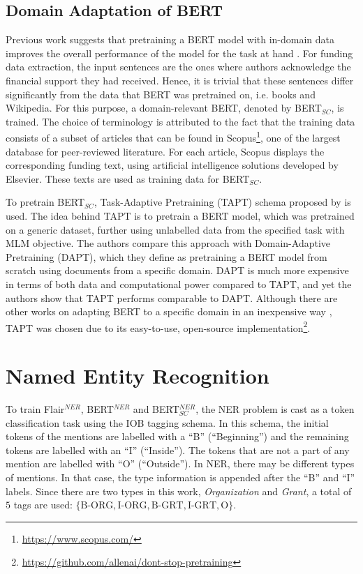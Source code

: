 \documentclass{report}
\theoremstyle{definition}
\theoremstyle{remark}
\begin{document}
\subsection{Domain Adaptation of BERT}
Previous work suggests that pretraining a BERT model with in-domain data improves the overall performance of the model for the task at hand \cite{DontStop,exBERT,quote3}. For funding data extraction, the input sentences are the ones where authors acknowledge the financial support they had received. Hence, it is trivial that these sentences differ significantly from the data that BERT was pretrained on, i.e. books and Wikipedia.  For this purpose, a domain-relevant BERT, denoted by BERT$_{SC}$, is trained. The choice of terminology is attributed to the fact that the training data consists of a subset of articles that can be found in Scopus\footnote{\url{https://www.scopus.com/}}, one of the largest database for peer-reviewed literature. For each article, Scopus displays the corresponding funding text, using artificial intelligence solutions developed by Elsevier. These texts are used as training data for BERT$_{SC}$.

To pretrain BERT$_{SC}$, Task-Adaptive Pretraining (TAPT) schema proposed by \cite{DontStop} is used. The idea behind TAPT is to pretrain a BERT model, which was pretrained on a generic dataset, further using unlabelled data from the specified task with MLM objective. The authors compare this approach with Domain-Adaptive Pretraining (DAPT), which they define as pretraining a BERT model from scratch using documents from a specific domain. DAPT is much more expensive in terms of both data and computational power compared to TAPT, and yet the authors show that TAPT performs comparable to DAPT. Although there are other works on adapting BERT to a specific domain in an inexpensive way \cite{exBERT,word2vectoBERT}, TAPT was chosen due to its easy-to-use, open-source implementation\footnote{\url{https://github.com/allenai/dont-stop-pretraining}}.


\section{Named Entity Recognition}
\label{sec:NERMEThod}

To train  Flair$^{NER}$, BERT$^{NER}$ and BERT$^{NER}_{SC}$, the NER problem is cast as a token classification task using the IOB tagging schema. In this schema, the initial tokens of the mentions are labelled with a ``B'' (``Beginning'') and the remaining tokens are labelled with an ``I'' (``Inside''). The tokens that are not a part of any mention are labelled with ``O'' (``Outside''). In NER, there may be different types of mentions. In that case, the type information is appended after the ``B'' and ``I'' labels. Since there are two types in this work, \textit{Organization} and \textit{Grant}, a total of $5$ tags are used: $\{ \text{B-ORG}, \text{I-ORG}, \text{B-GRT}, \text{I-GRT}, \text{O} \}$.
\end{document}
